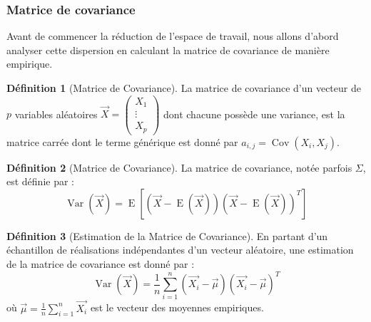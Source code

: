 \documentclass[12pt,french]{article}
\theoremstyle{plain}
\theoremstyle{definition}
\newtheorem{defi}{Définition}
\DeclareMathOperator\Var{Var}
\DeclareMathOperator\Cov{Cov}
\DeclareMathOperator\esp{E}
\begin{document}
\subsubsection{Matrice de covariance}
Avant de commencer la réduction de l'espace de travail, nous allons d'abord analyser cette dispersion en calculant la matrice de covariance de manière empirique.

\begin{defi}[Matrice de Covariance]
  La matrice de covariance d'un vecteur de $p$ variables aléatoires $\overrightarrow{X} =
  \begin{pmatrix}
    X_1 \\
    \vdots \\
    X_p
  \end{pmatrix}$ dont chacune possède une variance, est la matrice carrée dont le terme générique est donné par $a_{i,j} = \Cov(X_i,X_j)$.
\end{defi}

\begin{defi}[Matrice de Covariance]
  La matrice de covariance, notée parfois $\Sigma$, est définie par :
  \[
    \Var(\overrightarrow{X}) = \esp[(\overrightarrow{X}-\esp(\overrightarrow{X})) (\overrightarrow{X}-\esp(\overrightarrow{X}))^T]
  \]
\end{defi}

\begin{defi}[Estimation de la Matrice de Covariance]
  En partant d’un échantillon de réalisations indépendantes d’un vecteur aléatoire, une estimation de la matrice de covariance est donné par :
  \[
    \Var(\overrightarrow{X}) = \frac{1}{n} \displaystyle\sum_{i=1}^{n} (\overrightarrow{X_i} - \overrightarrow{\mu})(\overrightarrow{X_i}-\overrightarrow{\mu})^T
  \]
  où $\overrightarrow{\mu} = \frac{1}{n} \displaystyle\sum_{i=1}^{n}\overrightarrow{X_i}$ est le vecteur des moyennes empiriques.
\end{defi}
\end{document}
